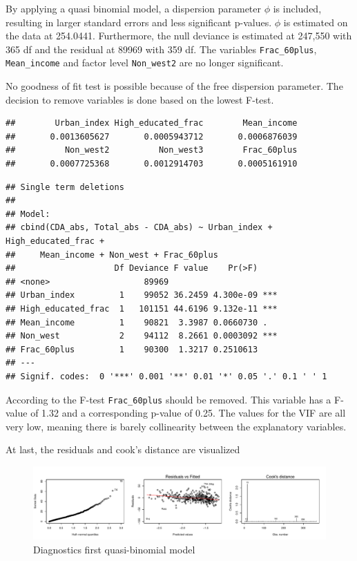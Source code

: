 \documentclass[11pt,]{article}
\begin{document}
By applying a quasi binomial model, a dispersion parameter \(\phi\) is
included, resulting in larger standard errors and less significant
p-values. \(\phi\) is estimated on the data at 254.0441. Furthermore,
the null deviance is estimated at 247,550 with 365 df and the residual
at 89969 with 359 df. The variables \texttt{Frac\_60plus},
\texttt{Mean\_income} and factor level \texttt{Non\_west2} are no longer
significant.

No goodness of fit test is possible because of the free dispersion
parameter. The decision to remove variables is done based on the lowest
F-test.

\begin{verbatim}
##        Urban_index High_educated_frac        Mean_income 
##       0.0013605627       0.0005943712       0.0006876039 
##          Non_west2          Non_west3        Frac_60plus 
##       0.0007725368       0.0012914703       0.0005161910
\end{verbatim}

\begin{verbatim}
## Single term deletions
## 
## Model:
## cbind(CDA_abs, Total_abs - CDA_abs) ~ Urban_index + High_educated_frac + 
##     Mean_income + Non_west + Frac_60plus
##                    Df Deviance F value    Pr(>F)    
## <none>                   89969                      
## Urban_index         1    99052 36.2459 4.300e-09 ***
## High_educated_frac  1   101151 44.6196 9.132e-11 ***
## Mean_income         1    90821  3.3987 0.0660730 .  
## Non_west            2    94112  8.2661 0.0003092 ***
## Frac_60plus         1    90300  1.3217 0.2510613    
## ---
## Signif. codes:  0 '***' 0.001 '**' 0.01 '*' 0.05 '.' 0.1 ' ' 1
\end{verbatim}

According to the F-test \texttt{Frac\_60plus} should be removed. This
variable has a F-value of 1.32 and a corresponding p-value of 0.25. The
values for the VIF are all very low, meaning there is barely
collinearity between the explanatory variables.

At last, the residuals and cook's distance are visualized

\begin{figure}[H]

{\centering \includegraphics{Report_files/figure-latex/unnamed-chunk-15-1} 

}

\caption{\label{ass_mdl2}Diagnostics first quasi-binomial model}\label{fig:unnamed-chunk-15}
\end{figure}
\end{document}
